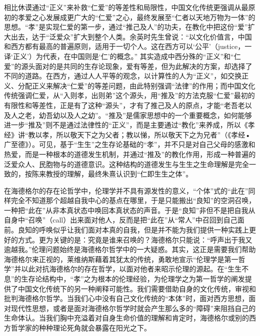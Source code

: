 \documentclass[UTF8, 12pt, a4paper]{ctexrep}
\begin{document}
相比休谟通过“正义”来补救“仁爱”的等差性和局限性，中国文化传统更强调从最原初的孝爱之心发展成更广大的“仁爱”之心，最终发展至“仁者以天地万物为一体”的思想。“孝”是实现仁爱的第一步，通过“推己及人”的功夫，在教化中把这份“爱”扩大出去，达于“泛爱众”扩大到整个人类。余英时先生曾说：“以文化价值言，中国和西方都有最高的普遍原则，适用于一切个人。这在西方可以‘公平’（justice，一译‘正义’）为代表，在中国则是‘仁’的概念。” 其实造成中西分殊的“正义”和“仁爱”的源头面对的是共同的生存论现象，爱有等差，但为此解决的方案，却选择了不同的道路。在西方，通过人人平等的观念，以计算性的人为“正义”，如交换正义、分配正义来解决“仁爱”的等差问题，由此特别强调“法律”的作用；而中国文化传统强调仁爱，从“入则孝，出则弟”这个源头，用“推及”的方法克服“仁爱”最初的有限性和等差性，正是有了这种“源头”，才有了推己及人的原点，才能“老吾老以及人之老，幼吾幼以及人之幼”。“推及”是儒家思想中的一个重要概念，如何能够进一步“推及”则不是通过法律性的“正义”，而是主要通过“教化”来养成，所以《孝经》讲“教以孝，所以敬天下之为父者；教以悌，所以敬天下之为兄者”（《孝经•广至德》）。可见，基于“生生”之生存论基础的“孝”，并不只是对自己父母的感激和热爱，而是一种根本的道德发生机制，并通过“推及”的教化作用，形成一种普遍的泛爱众人、民胞物与的道德意识。这种结构的道德发生与生生之生命理解是完全一致的，按陈来教授的理解，最终朱熹认识到“仁即生生之体”。

在海德格尔的存在论哲学中，伦理学并不具有源发性的意义，“个体”式的“此在”同样完全不知道那个超越自我中心的基点在哪里，于是只能搬出“良知”的空洞召唤，一种把“此在”从非本真状态中唤回本真状态的声音。于是“良知”非但不是把自我从自身中“召唤”（call）出来面对他人，反而是把“此在”从“常人”中召回到自己面前。良知的呼唤似乎让我们面对本真的自我，但是并不能为我们提供一种实践上更好的方式。更为关键的是：究竟是谁来召唤的？海德格尔只能说：“呼声出于我又逾越我。”伦理问题始终是海德格尔哲学中的一大疑惑。其实，这正是需要我们帮助海德格尔来正视的，莱维纳斯藉着其犹太的传统，勇敢地宣示“伦理学是第一哲学”并以此对抗海德格尔的存在哲学，以面对他者来昭示伦理的源起。在“生生不息”的生存论结构中，“孝”之为根本的伦理经验，为伦理学之为第一哲学的阐发提供了中国文化传统下的另一种阐释可能性。我们需要借助自身的文化传统，审视和批判海德格尔哲学。当我们心中没有自己文化传统的“本体”时，面对西方思想，面对现代性思想，或者是面对海德格尔哲学时就会产生那么多的“障碍”来阻挡自己的生命体认。当我们胸中充溢着对自身生命价值的理解和肯定时，海德格尔或别的西方哲学家的种种理论死角就会暴露在阳光之下。
\end{document}
